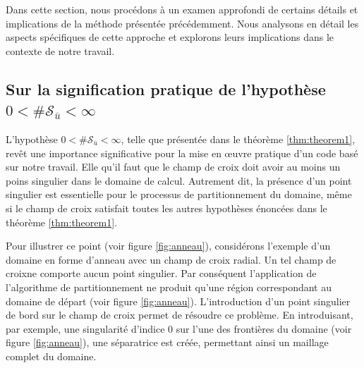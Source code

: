 Dans cette section, nous procédons à un examen approfondi de certains détails et implications de la méthode présentée précédemment. Nous analysons en détail les aspects spécifiques de cette approche et explorons leurs implications dans le contexte de notre travail.

\subsection{Sur la signification pratique de l'hypothèse $0<\#\mathcal{S}_{\bar{u}}<\infty$}

L'hypothèse $0<\#\mathcal{S}_{\bar{u}}<\infty$, telle que présentée dans le théorème \ref{thm:theorem1}, revêt une importance significative pour la mise en œuvre pratique d'un code basé sur notre travail. Elle qu'il faut que le champ de croix doit avoir au moins un poins singulier dans le domaine de calcul. Autrement dit, la présence d'un point singulier est essentielle pour le processus de partitionnement du domaine, même si le champ de croix satisfait toutes les autres hypothèses énoncées dans le théorème \ref{thm:theorem1}.

Pour illustrer ce point (voir figure \ref{fig:anneau}), considérons l'exemple d'un domaine en forme d'anneau avec un champ de croix radial. Un tel champ de croixne comporte aucun point singulier. Par conséquent l'application de l'algorithme de partitionnement ne produit qu'une région correspondant au domaine de départ (voir figure \ref{fig:anneau}). L'introduction d'un point singulier de bord sur le champ de croix permet de résoudre ce problème. En introduisant, par exemple, une singularité d'indice 0 sur l'une des frontières du domaine (voir figure \ref{fig:anneau}), une séparatrice est créée, permettant ainsi un maillage complet du domaine.

